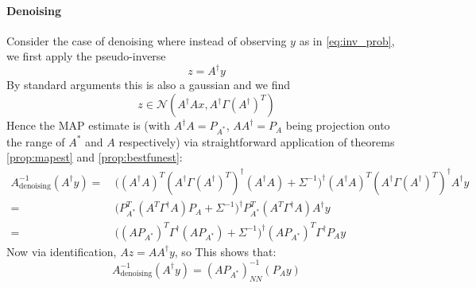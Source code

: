 \documentclass[a4paper,10pt]{article}
\begin{document}
	\paragraph{Denoising}
	
	Consider the case of denoising where instead of observing $y$ as in \ref{eq:inv_prob}, we first apply the pseudo-inverse
	\[
		z = A^\dagger y
	\]
	By standard arguments this is also a gaussian and we find
	\[
		z \in \mathcal{N}(A^\dagger A x, A^\dagger \Gamma ({A^\dagger})^T)
	\]
	Hence the MAP estimate is (with $A^\dagger A = P_{A^*}$, $A A^\dagger = P_{A}$ being projection onto the range of $A^*$ and $A$ respectively) via straightforward application of theorems \ref{prop:mapest} and \ref{prop:bestfunest}:
	\begin{align*}
		A^{-1}_{\text{denoising}}(A^\dagger y) 
		=&\
		\big((A^\dagger A)^T (A^\dagger \Gamma ({A^\dagger})^T)^{\dagger} (A^\dagger A) + \Sigma^{-1}\big)^{\dagger} (A^\dagger A)^T (A^\dagger \Gamma ({A^\dagger})^T)^{\dagger} A^\dagger y
		\\=&\
		\big(P_{A^*}^T (A^T \Gamma^{\dagger} A) P_{A} + \Sigma^{-1}\big)^{\dagger} P_{A^*}^T (A^T \Gamma^\dagger A) A^\dagger y
		\\=&\
		\big((A P_{A^*})^T \Gamma^{\dagger} (A P_{A^*}) + \Sigma^{-1}\big)^{\dagger} (A P_{A^*})^T \Gamma^\dagger P_A y
	\end{align*}
	Now via identification, $Az = A A^\dagger y$, so
	This shows that:
	\[
		A^{-1}_{\text{denoising}}(A^\dagger y) = (A P_{A^*})^{-1}_{NN}(P_A y)
	\]

\printbibliography%
	
\end{document}

